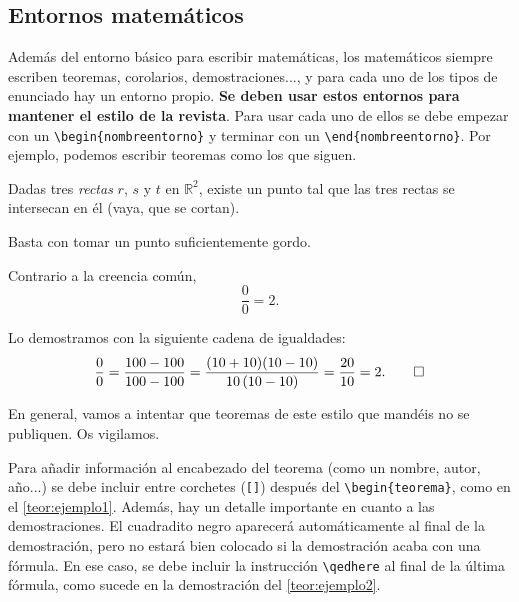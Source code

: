 \documentclass[%
extracommands,%
]{revistaanem}
\begin{document}
\subsection{Entornos matemáticos}

Además del entorno básico para escribir matemáticas, los matemáticos siempre escriben teoremas, corolarios, demostraciones..., y para cada uno de los tipos de enunciado hay un entorno propio.
\textbf{Se deben usar estos entornos para mantener el estilo de la revista}.
Para usar cada uno de ellos se debe empezar con un \verb+\begin{nombreentorno}+ y terminar con un \verb+\end{nombreentorno}+.
Por ejemplo, podemos escribir teoremas como los que siguen.

\begin{teorema}\label{teor:ejemplo1}
Dadas tres \emph{rectas} $r$, $s$ y\/ $t$ en $\mathbb{R}^2$, existe un punto tal que las tres rectas se intersecan en él (vaya, que se cortan).
\end{teorema}

\begin{demostracion}
Basta con tomar un punto suficientemente gordo.
\end{demostracion}

\begin{teorema}\label{teor:ejemplo2}
Contrario a la creencia común,
\[\frac{0}{0}=2.\]
\end{teorema}

\begin{demostracion}
Lo demostramos con la siguiente cadena de igualdades:
\[\frac{0}{0}=\frac{100-100}{100-100}=\frac{(10+10)(10-10)}{10\,(10-10)}=\frac{20}{10}=2.\qedhere\]
\end{demostracion}

\begin{nota*}
En general, vamos a intentar que teoremas de este estilo que mandéis no se publiquen. Os vigilamos.
\end{nota*}

Para añadir información al encabezado del teorema (como un nombre, autor, año...) se debe incluir entre corchetes (\verb+[]+) después del \verb+\begin{teorema}+, como en el \autoref{teor:ejemplo1}.
Además, hay un detalle importante en cuanto a las demostraciones.
El cuadradito negro aparecerá automáticamente al final de la demostración, pero no estará bien colocado si la demostración acaba con una fórmula.
En ese caso, se debe incluir la instrucción \verb+\qedhere+ al final de la última fórmula, como sucede en la demostración del \autoref{teor:ejemplo2}.
\end{document}
